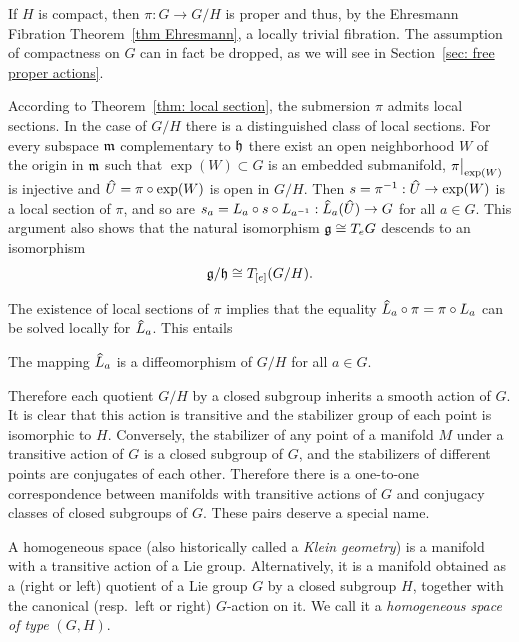 \begin{rem}
    If $H$ is compact, then $\pi:G\to G\slash H$ is proper and thus, by the Ehresmann Fibration Theorem~\ref{thm Ehresmann}, a locally trivial fibration. The assumption of compactness on $G$ can in fact be dropped, as we will see in Section~\ref{sec: free proper actions}.
\end{rem}

\begin{rem}
    According to Theorem~\ref{thm: local section}, the submersion $\pi$ admits local sections. In the case of $G\slash H$ there is a distinguished class of local sections. For every subspace $\mathfrak{m}$ complementary to $\mathfrak{h}$ there exist an open neighborhood $W$ of the origin in $\mathfrak{m}$ such that $\exp(W)\subset G$ is an embedded submanifold, $\restr{\pi}{\exp(W)}$ is injective and $\wh{U}=\pi\circ\exp(W)$ is open in $G\slash H$. Then $s=\pi^{-1}:\wh{U}\to \exp(W)$ is a local section of $\pi$, and so are $s_a=L_a\circ s\circ L_{a^{-1}}:\wh{L}_a(\wh{U})\to G$ for all $a\in G$. This argument also shows that the natural isomorphism $\mathfrak{g}\cong T_e G$ descends to an isomorphism 
    \[\mathfrak{g}\slash \mathfrak{h}\cong T_{[e]}(G\slash H).\]
\end{rem}

The existence of local sections of $\pi$ implies that the equality $\wh{L}_a\circ\pi=\pi\circ L_a$ can be solved locally for $\wh{L}_a$. This entails
\begin{cor}
    The mapping $\wh{L}_a$ is a diffeomorphism of $G\slash H$ for all $a\in G$.
\end{cor}

Therefore each quotient $G\slash H$ by a closed subgroup inherits a smooth action of $G$. It is clear that this action is transitive and the stabilizer group of each point is isomorphic to $H$. Conversely, the stabilizer of any point of a manifold $M$ under a transitive action of $G$ is a closed subgroup of $G$, and the stabilizers of different points are conjugates of each other. Therefore there is a one-to-one correspondence between manifolds with transitive actions of $G$ and conjugacy classes of closed subgroups of $G$. These pairs deserve a special name.

\begin{defn}
    A homogeneous space (also historically called a \emph{Klein geometry}) is a manifold with a transitive action of a Lie group. Alternatively, it is a manifold obtained as a (right or left) quotient of a Lie group $G$ by a closed subgroup $H$, together with the canonical (resp.~left or right) $G$-action on it. We call it a \emph{homogeneous space of type} $(G,H)$.
\end{defn}

